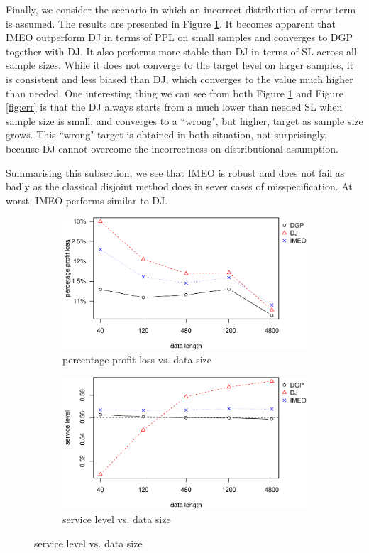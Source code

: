 \documentclass{article}
\begin{document}
Finally, we consider the scenario in which an incorrect distribution of error term is assumed. The results are presented in Figure \ref{fig:err_non}. It becomes apparent that IMEO outperform DJ in terms of PPL on small samples and converges to DGP together with DJ. It also performs more stable than DJ in terms of SL across all sample sizes. While it does not converge to the target level on larger samples, it is consistent and less biased than DJ, which converges to the value much higher than needed. One interesting thing we can see from both Figure \ref{fig:err_non} and Figure \ref{fig:err} is that the DJ always starts from a much lower than needed SL when sample size is small, and converges to a ``wrong", but higher, target as sample size grows. This ``wrong" target is obtained in both situation, not surprisingly, because DJ cannot overcome the incorrectness on distributional assumption.

Summarising this subsection, we see that IMEO is robust and does not fail as badly as the classical disjoint method does in sever cases of misspecification. At worst, IMEO performs similar to DJ.

\begin{figure}[ht]
\centering
\caption{Performance vs. sample size with Laplace distributed error term, nonlinear model}
\begin{subfigure}[b]{0.48\textwidth}
\centering
\includegraphics[width=\textwidth]{nonlaplaceppl.pdf}
\caption{percentage profit loss vs. data size}
\end{subfigure}
\hfill
\begin{subfigure}[b]{0.48\textwidth}
\centering
\includegraphics[width=\textwidth]{nonlaplacesl.pdf}
\caption{service level vs. data size}
\end{subfigure}
\label{fig:err_non}
\end{figure}
\end{document}

